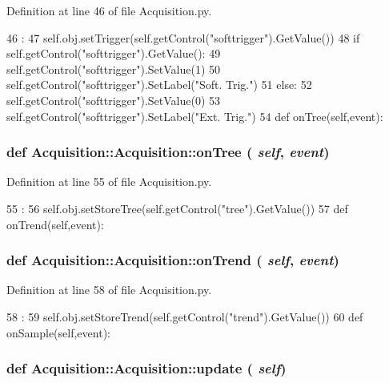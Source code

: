 Definition at line 46 of file Acquisition.py.


\begin{DoxyCode}
46                               :
47         self.obj.setTrigger(self.getControl("softtrigger").GetValue())
48         if self.getControl("softtrigger").GetValue():
49             self.getControl("softtrigger").SetValue(1)
50             self.getControl("softtrigger").SetLabel("Soft. Trig.")
51         else:
52             self.getControl("softtrigger").SetValue(0)
53             self.getControl("softtrigger").SetLabel("Ext. Trig.")
54 
    def onTree(self,event):
\end{DoxyCode}
\hypertarget{classAcquisition_1_1Acquisition_a807185c8bcc9a144e7923a03a9d5ba1a}{
\subsubsection[{onTree}]{\setlength{\rightskip}{0pt plus 5cm}def Acquisition::Acquisition::onTree ( {\em self}, \/   {\em event})}}
\label{classAcquisition_1_1Acquisition_a807185c8bcc9a144e7923a03a9d5ba1a}


Definition at line 55 of file Acquisition.py.


\begin{DoxyCode}
55                           :
56         self.obj.setStoreTree(self.getControl("tree").GetValue())
57 
    def onTrend(self,event):
\end{DoxyCode}
\hypertarget{classAcquisition_1_1Acquisition_ade4cfb94d7d3a43e7ba448425a8fb098}{
\subsubsection[{onTrend}]{\setlength{\rightskip}{0pt plus 5cm}def Acquisition::Acquisition::onTrend ( {\em self}, \/   {\em event})}}
\label{classAcquisition_1_1Acquisition_ade4cfb94d7d3a43e7ba448425a8fb098}


Definition at line 58 of file Acquisition.py.


\begin{DoxyCode}
58                            :
59         self.obj.setStoreTrend(self.getControl("trend").GetValue())
60 
    def onSample(self,event):
\end{DoxyCode}
\hypertarget{classAcquisition_1_1Acquisition_a52a017e2e8ce5fdd0734ef1ca38eb3b3}{
\subsubsection[{update}]{\setlength{\rightskip}{0pt plus 5cm}def Acquisition::Acquisition::update ( {\em self})}}
\label{classAcquisition_1_1Acquisition_a52a017e2e8ce5fdd0734ef1ca38eb3b3}



